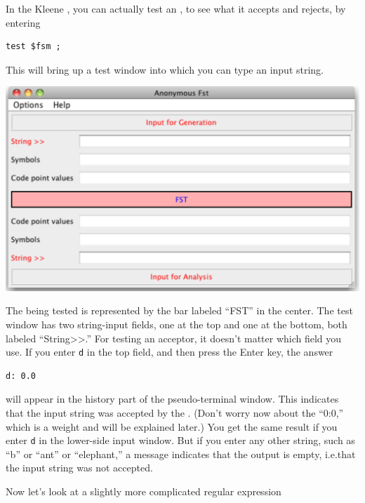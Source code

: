 In the Kleene , you can actually test an \fsm{}, to see what it accepts and rejects, by entering

\begin{Verbatim}
test $fsm ;
\end{Verbatim}

\noindent
This will bring up a test window into which you can type an input string.


\begin{center}
\includegraphics[width=135mm]{images/testWindow.pdf}
\end{center}

\noindent
The \fst{} being tested
is represented by the bar labeled ``FST'' in the center.
The test window has two string-input fields, one at the top and one at the bottom, both labeled
``String>>.''  For testing
an acceptor, it doesn't matter which field you use.  If you enter \texttt{d} in the top 
field, and then press the Enter key, the answer 


\begin{Verbatim}
d: 0.0
\end{Verbatim}

\noindent
will appear in the history part
of the pseudo-terminal window.  This indicates that the input string was accepted
by the \fsm{}.  (Don't worry now
about the ``0:0,'' which is a weight and will be explained later.)
You get the same result if you enter \texttt{d} in the
lower-side input window.  But if you enter any other string, such as ``b'' or
``ant'' or ``elephant,'' a message
indicates that the output is empty, i.e.\@ that the input string was not
accepted.

Now let's look at a slightly more complicated regular expression

